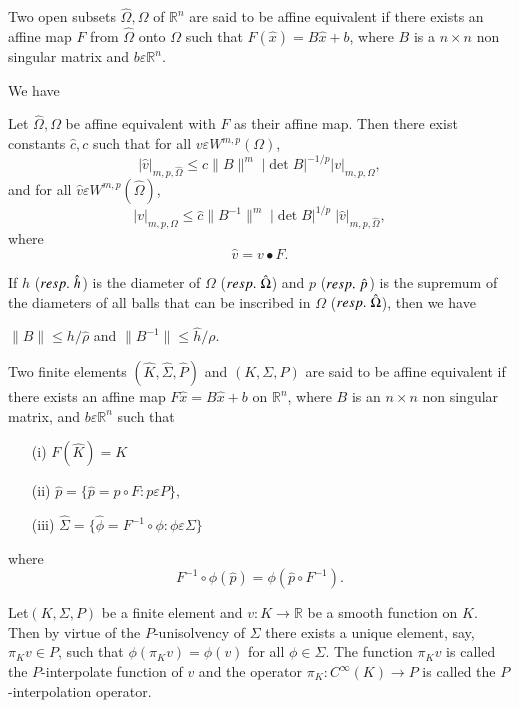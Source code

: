 \begin{def*}
Two open subsets $\hat{\Omega}, \Omega$ of $\mathbb{R}^n$ are said to
be affine equivalent if there exists an affine map $F$ from
$\hat{\Omega}$ onto $\Omega$ such that $F(\hat{x})=B\hat{x}+b$, where
$B$ is a $n\times n$ non singular matrix and
$b\varepsilon\mathbb{R}^n$.

We have 
\end{def*}

\begin{THM}\label{chap5:THM3}
Let $\hat{\Omega}, \Omega$ be affine equivalent with $F$ as their
affine map. Then there exist constants $\hat{c},c$ such that for all
$v\varepsilon W^{m,p}(\Omega)$,\pageoriginale
$$
|\hat{v}|_{m,p,\hat{\Omega}}\leq c\parallel B\parallel^m\;|\det
B|^{-1/p}|v|_{m,p,\Omega},
$$
and for all $\hat{v}\varepsilon W^{m,p}(\hat{\Omega})$,
$$
|v|_{m,p,\Omega}\leq\hat{c}\parallel B^{-1}\parallel^m\;|\det
B|^{1/p}\;|\hat{v}|_{m,p,\hat{\Omega}},
$$
where
$$
\hat{v}=v\bullet F.
$$ 
\end{THM}

If $h$ (${resp.}\kern.3em \hat{h}$) is the diameter of $\Omega$ (${resp.}\kern.3em
\hat{\Omega}$) and $p$ (${resp.}\kern.3em \hat{p}$) is the supremum of the
diameters of all balls that can be inscribed in $\Omega$ (${resp.}\kern.3em
\hat{\Omega}$), then we have 

\begin{THM}\label{chap5:THM4}
$\parallel B\parallel \leq h/\hat{\rho}$ and $\parallel B^{-1}
\parallel \leq \hat{h}/\rho$.
\end{THM}

\begin{def*}
Two finite elements $(\hat{K}, \hat{\Sigma}, \hat{P})$ and $(K, \Sigma,
P)$ are said to be affine equivalent if there exists an affine map
$F\hat{x}= B\hat{x}+b$ on $\mathbb{R}^n$, where $B$ is an $n \times n$
non singular matrix, and $b\varepsilon\mathbb{R}^n$ such that 

\begin{enumerate}
\item [(i)] $F(\hat{K})= K$
\item [(ii)] $\hat{p} =\{\hat{p}=p \circ F:p\varepsilon P\}$,
\item [(iii)] $\hat{\Sigma} =\{\hat{\phi}=F^{-1}\circ\phi:\phi\varepsilon
\Sigma\}$ 
\end{enumerate}
where
$$
F^{-1}\circ\phi(\hat{p})=\phi(\hat{p}\circ F^{-1}).
$$
\end{def*}

\begin{def*}
Let\pageoriginale $(K,\Sigma, P)$ be a finite element and
$v:K\to\mathbb{R}$ be a smooth function on $K$. Then by virtue of the
$P$-unisolvency of $\Sigma$ there exists a unique element, say,
$\pi_Kv\in P$, such that $\phi(\pi_Kv)=\phi(v)$ for all
$\phi\in \Sigma$. The function $\pi_Kv$ is called the
$P$-interpolate function of $v$ and the operator $\pi_K:C^\infty(K)\to
P$ is called the $P$-interpolation operator.
\end{def*}

